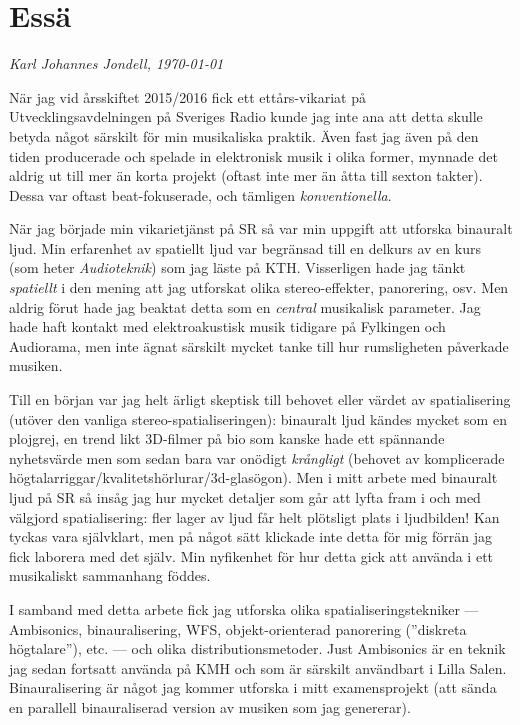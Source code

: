 \documentclass[12pt]{article}
\begin{document}
\section*{Essä}
\begin{center}
		\emph{\large{Karl Johannes Jondell, \today}}
\end{center}
När jag vid årsskiftet 2015/2016 fick ett ettårs-vikariat på Utvecklingsavdelningen på Sveriges Radio kunde jag inte ana att detta skulle betyda något särskilt för min musikaliska praktik. Även fast jag även på den tiden producerade och spelade in elektronisk musik i olika former, mynnade det aldrig ut till mer än korta projekt (oftast inte mer än åtta till sexton takter). Dessa var oftast beat-fokuserade, och tämligen \emph{konventionella}. 

När jag började min vikarietjänst på SR så var min uppgift att utforska binauralt ljud. Min erfarenhet av spatiellt ljud var begränsad till en delkurs av en kurs (som heter \emph{Audioteknik}) som jag läste på KTH. Visserligen hade jag tänkt \emph{spatiellt} i den mening att jag utforskat olika stereo-effekter, panorering, osv. Men aldrig förut hade jag beaktat detta som en \emph{central} musikalisk parameter. Jag hade haft kontakt med elektroakustisk musik tidigare på Fylkingen och Audiorama, men inte ägnat särskilt mycket tanke till hur rumsligheten påverkade musiken.

Till en början var jag helt ärligt skeptisk till behovet eller värdet av spatialisering (utöver den vanliga stereo-spatialiseringen): binauralt ljud kändes mycket som en plojgrej, en trend likt 3D-filmer på bio som kanske hade ett spännande nyhetsvärde men som sedan bara var onödigt \emph{krångligt} (behovet av komplicerade högtalarriggar/kvalitetshörlurar/3d-glasögon). Men i mitt arbete med binauralt ljud på SR så insåg jag hur mycket detaljer som går att lyfta fram i och med välgjord spatialisering: fler lager av ljud får helt plötsligt plats i ljudbilden! Kan tyckas vara självklart, men på något sätt klickade inte detta för mig förrän jag fick laborera med det själv. Min nyfikenhet för hur detta gick att använda i ett musikaliskt sammanhang föddes.

I samband med detta arbete fick jag utforska olika spatialiseringstekniker --- Ambisonics, binauralisering, WFS, objekt-orienterad panorering (''diskreta högtalare''), etc. --- och olika distributionsmetoder. Just Ambisonics är en teknik jag sedan fortsatt använda på KMH och som är särskilt användbart i Lilla Salen. Binauralisering är något jag kommer utforska i mitt examensprojekt (att sända en parallell binauraliserad version av musiken som jag genererar).
\end{document}
